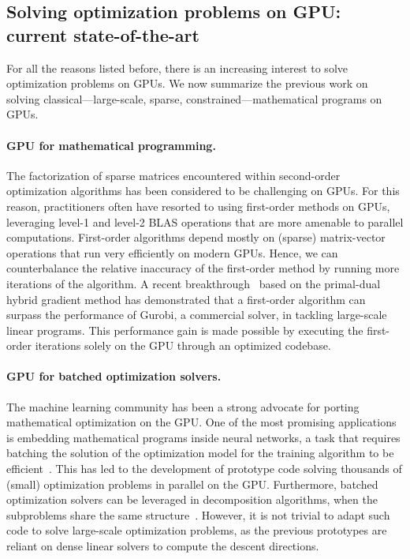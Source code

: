 \subsection{Solving optimization problems on GPU: current state-of-the-art}
For all the reasons listed before, there is an increasing interest to solve optimization problems on GPUs.
We now summarize the previous work on solving classical---large-scale, sparse, constrained---mathematical programs on GPUs.

\paragraph{GPU for mathematical programming.}
The factorization of sparse matrices encountered within second-order optimization algorithms has been considered to be challenging  on GPUs.
For this reason, practitioners often have resorted to using first-order
methods on GPUs, leveraging level-1 and level-2 BLAS operations that
are more amenable to parallel computations.
First-order algorithms depend mostly on (sparse) matrix-vector operations that run
very efficiently on modern GPUs. Hence, we can counterbalance
the relative inaccuracy of the first-order method by running more
iterations of the algorithm.
A recent breakthrough~\cite{lu2023cupdlp,lu2023cupdlp2} based on the primal-dual hybrid gradient method has demonstrated
that a first-order algorithm can surpass the performance of Gurobi, a
commercial solver, in tackling large-scale linear programs. This
performance gain is made possible by executing the first-order
iterations solely on the GPU through an optimized codebase.

\paragraph{GPU for batched optimization solvers.}
The machine learning community has been a strong advocate for porting
mathematical optimization on the GPU. One of the most promising
applications is embedding mathematical programs inside neural networks,
a task that requires batching the solution of the optimization model
for the training algorithm to be
efficient~\cite{amos2017optnet,pineda2022theseus}.  This has led to
the development of prototype code solving thousands of (small)
optimization problems in parallel on the GPU.
Furthermore, batched optimization solvers can be leveraged
in decomposition algorithms, when the subproblems share the same structure~\cite{kimLeveragingGPUBatching2021}.
However, it is not trivial to adapt such code to solve large-scale optimization problems,
as the previous prototypes are reliant on dense linear solvers to
compute the descent directions.

